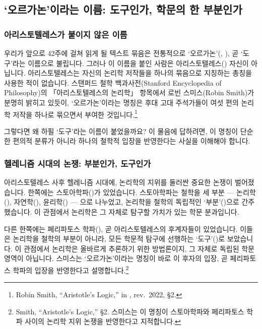 \documentclass[12pt, a4paper]{article}
\begin{document}
\thispagestyle{firstpage}


\subsection{`오르가논'이라는 이름: 도구인가, 학문의 한 부분인가}

\subsubsection{아리스토텔레스가 붙이지 않은 이름}

우리가 앞으로 42주에 걸쳐 읽게 될 텍스트 묶음은 전통적으로 `오르가논'(, ), 곧 `도구'라는 이름으로 불립니다. 그러나 이 이름을 붙인 사람은 아리스토텔레스() 자신이 아닙니다. 아리스토텔레스는 자신의 논리학 저작들을 하나의 묶음으로 지칭하는 총칭을 사용한 적이 없습니다. 스탠퍼드 철학 백과사전(Stanford Encyclopedia of Philosophy)의 「아리스토텔레스의 논리학」 항목에서 로빈 스미스(Robin Smith)가 분명히 밝히고 있듯이, `오르가논'이라는 명칭은 후대 고대 주석가들이 여섯 편의 논리학 저작을 하나로 묶으면서 부여한 것입니다.\footnote{Robin Smith, ``Aristotle's Logic,'' in , rev.\ 2022, §2.}

그렇다면 왜 하필 `도구'라는 이름이 붙었을까요? 이 물음에 답하려면, 이 명칭이 단순한 편의적 분류가 아니라 하나의 철학적 입장을 반영한다는 사실을 이해해야 합니다.

\subsubsection{헬레니즘 시대의 논쟁: 부분인가, 도구인가}

아리스토텔레스 사후 헬레니즘 시대에, 논리학의 지위를 둘러싼 중요한 논쟁이 벌어졌습니다. 한쪽에는 스토아학파()가 있었습니다. 스토아학파는 철학을 세 부분 --- 논리학(), 자연학(), 윤리학() --- 으로 나누었고, 논리학을 철학의 독립적인 `부분'()으로 간주했습니다. 이 관점에서 논리학은 그 자체로 탐구할 가치가 있는 학문 분과입니다.

다른 한쪽에는 페리파토스 학파(), 곧 아리스토텔레스의 후계자들이 있었습니다. 이들은 논리학을 철학의 부분이 아니라, 모든 학문적 탐구에 선행하는 `도구'()로 보았습니다. 이 관점에서 논리학은 올바르게 추론하기 위한 방법론이지, 그 자체로 독립된 학문 영역이 아닙니다. 스미스는 `오르가논'이라는 명칭이 바로 이 후자의 입장, 곧 페리파토스 학파의 입장을 반영한다고 설명합니다.\footnote{Smith, ``Aristotle's Logic,'' §2. 스미스는 이 명칭이 스토아학파와 페리파토스 학파 사이의 논리학 지위 논쟁을 반영한다고 지적합니다.}
\end{document}
